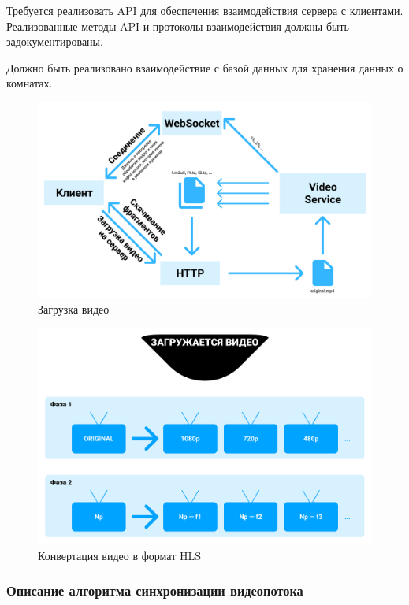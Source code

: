 \documentclass{../includes/TechDoc}
\begin{document}
	Требуется реализовать API для обеспечения взаимодействия сервера с клиентами.
	Реализованные методы API и протоколы взаимодействия должны быть задокументированы.

	Должно быть реализовано взаимодействие с базой данных для хранения данных о комнатах.

    \begin{figure}[h]
        \centering
        \includegraphics[width=1\linewidth]{images/video_upload.png}
        \caption{Загрузка видео}
        \label{fig:uml_pr}
    \end{figure}

    \begin{figure}[h]
        \centering
        \includegraphics[width=1\linewidth]{images/server_converting.png}
        \caption{Конвертация видео в формат HLS}
        \label{fig:server_converting}
    \end{figure}

    \subsubsection{Описание алгоритма синхронизации видеопотока}
\end{document}
